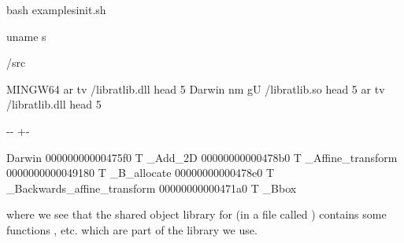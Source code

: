 \documentclass[letterpaper,10pt,english]{sphinxmanual}
\newlength\nbsphinxcodecellspacing
\begin{document}
{
\begin{sphinxVerbatim}[commandchars=\\\{\}]
\llap{\color{nbsphinxin}[20]:\,\hspace{\fboxrule}\hspace{\fboxsep}}\PYGZpc{}\PYGZpc{}bash
 examples\PYGZus{}init.sh

uname \PYGZhy{}s
 

/src


 \PYG{o}{[}   MINGW64 \PYG{o}{]}
  ar tv /libratlib.dll  head \PYGZhy{}5
 \PYG{o}{[}   Darwin \PYG{o}{]}
  nm \PYGZhy{}gU /libratlib.so  head \PYGZhy{}5
  ar tv /libratlib.dll  head \PYGZhy{}5
\end{sphinxVerbatim}
}

{

\kern-\sphinxverbatimsmallskipamount\kern-\baselineskip
\kern+\FrameHeightAdjust\kern-\fboxrule
\vspace{\nbsphinxcodecellspacing}

\begin{sphinxVerbatim}[commandchars=\\\{\}]
Darwin
00000000000475f0 T \_Add\_2D
00000000000478b0 T \_Affine\_transform
0000000000049180 T \_B\_allocate
00000000000478e0 T \_Backwards\_affine\_transform
00000000000471a0 T \_Bbox
\end{sphinxVerbatim}
}

where we see that the shared object library for  (in a file called ) contains some functions ,  etc. which are part of the library we use.
\end{document}
